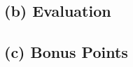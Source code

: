 \documentclass[a4paper]{article}
\begin{document}
\subsection*{(b) Evaluation}
\subsection*{(c) Bonus Points}
\end{document}

